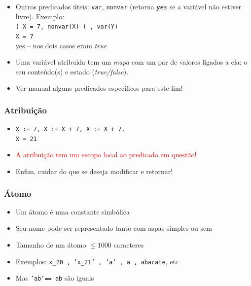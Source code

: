 \begin{frame} [allowframebreaks=0.9]
\begin{itemize}
\item Outros predicados úteis: \texttt{var}, \texttt{nonvar} (retorna \texttt{\textit{yes}} se a variável não estiver livre). Exemplo:\\
\texttt{( X = 7, nonvar(X) ) , var(Y) }\\
\texttt{X = 7}\\
yes -- nos dois casos eram \textit{true}\\

\item Uma variável atribuída tem um \textit{mapa} com um par de valores ligados a ela: o seu conteúdo(s) e estado (\textit{true/false}).

\item Ver manual alguns predicados específicos para este fim!

  \end{itemize}
    
\end{frame}

\begin{frame}
    \frametitle{Atribuição}


   
\begin{itemize}
  \item   \texttt{X := 7, X := X + 7, X := X + 7.}\\
     \texttt{X = 21}
     
   \item  \textcolor{red}{A atribuição tem um escopo local ao predicado em questão!}

   \item Enfim, cuidar do que se deseja modificar e retornar!
\end{itemize}

\end{frame}


\begin{frame}
    \frametitle{Átomo}
   
   \begin{itemize}
    
     \item Um átomo é uma constante simbólica
     \item Seu nome pode ser representado tanto com aspas simples ou sem
     \item Tamanho de um átomo $\le 1000$ caracteres
     \item Exemplos: \texttt{x\_20 , 'x\_21' , 'a' , a , abacate}, etc
     \item Mas \texttt{'ab'== ab} são iguais

   \end{itemize}
      
\end{frame}

